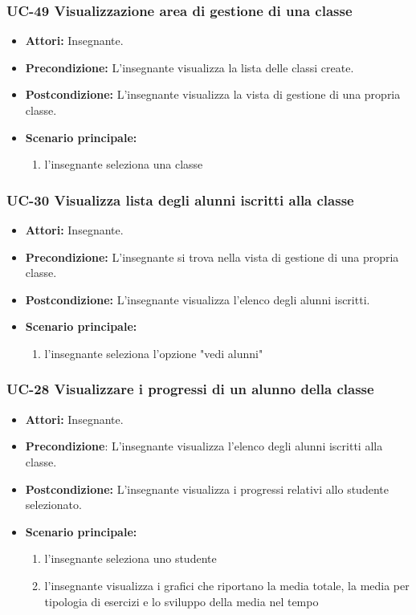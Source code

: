 \subsubsection{UC-49 Visualizzazione area di gestione di una classe}
\begin{itemize}
	\item \textbf{Attori:} Insegnante.
	\item \textbf{Precondizione:} L'insegnante visualizza la lista delle classi create.
	\item \textbf{Postcondizione:} L'insegnante visualizza la vista di gestione di una propria classe.
	\item \textbf{Scenario principale:}
	\begin{enumerate}
		\item l'insegnante seleziona una classe
	\end{enumerate}
\end{itemize}

\subsubsection{UC-30 Visualizza lista degli alunni iscritti alla classe}		
\begin{itemize}
	\item \textbf{Attori:} Insegnante.
	\item \textbf{Precondizione:} L'insegnante si trova nella vista di gestione di una propria classe.
	\item \textbf{Postcondizione:} L'insegnante visualizza l'elenco degli alunni iscritti.
	\item \textbf{Scenario principale:}
	\begin{enumerate}
		\item l'insegnante seleziona l'opzione "vedi alunni"
	\end{enumerate}		
\end{itemize}

\subsubsection{UC-28 Visualizzare i progressi di un alunno della classe}
\begin{itemize}
	\item \textbf{Attori:} Insegnante.
	\item \textbf{Precondizione}: L'insegnante visualizza l'elenco degli alunni iscritti alla classe.
	\item \textbf{Postcondizione:} L'insegnante visualizza i progressi relativi allo studente selezionato.
	\item \textbf{Scenario principale:}
	\begin{enumerate}
		\item l'insegnante seleziona uno studente
		\item l'insegnante visualizza i grafici che riportano la media totale, la media per tipologia di esercizi e lo sviluppo della media nel tempo
	\end{enumerate}
\end{itemize}


